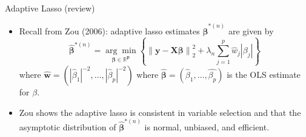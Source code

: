 \documentclass[notes]{beamer}       %
\begin{document}
\begin{frame}{Adaptive Lasso (review)}
  \begin{itemize}
  \item{Recall from Zou (2006): adaptive lasso estimates \(\hat{\boldsymbol{\beta}}^{*(n)}\) are given by
  \begin{equation}
  \hat{\boldsymbol{\beta}}^{*(n)} =\underset{\boldsymbol{\beta \in \mathbb{R}^p}}{\arg \min}   \left\{\left\lVert \boldsymbol{y} - \boldsymbol{X}\boldsymbol{\beta} \right\rVert_2^2 + \lambda_n \sum_{j=1}^p \hat{w}_j | \beta_j| \right\}
  \end{equation}
  where \(\hat{\boldsymbol{w}} = (|\hat{\beta}_1|^{-2},  \ldots, |\hat{\beta}_p|^{-2}) \) where \(\hat{\boldsymbol{\beta}} = (\hat{\beta}_1, \ldots, \hat{\beta_p})\) is the OLS estimate for \(\beta\).
  }
  \item{Zou shows the adaptive lasso is consistent in variable selection and that the asymptotic distribution of \( \hat{\boldsymbol{\beta}}^{*(n)} \) is normal, unbiased, and efficient. 
  }


  \end{itemize}
\end{frame}

\end{document}
